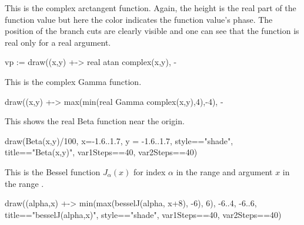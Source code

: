 {{{{{{{{{{{\begin{psXtc}
\begin{xtccomment}
This is the complex arctangent function.
Again, the height is the real part of the function value but here
the color indicates the function value's phase.
The position of the branch cuts are clearly visible and one can
see that the function is real only for a real argument.
\end{xtccomment}
\begin{spadsrc}
vp := draw((x,y) +-> real atan complex(x,y), -%
\end{spadsrc}
\end{psXtc}

\begin{psXtc}
\begin{xtccomment}
This is the complex Gamma function.
\end{xtccomment}
\begin{spadsrc}
draw((x,y) +-> max(min(real Gamma complex(x,y),4),-4), -%
\end{spadsrc}
\end{psXtc}

\begin{psXtc}
\begin{xtccomment}
This shows the real Beta function near the origin.
\end{xtccomment}
\begin{spadsrc}
draw(Beta(x,y)/100, x=-1.6..1.7, y = -1.6..1.7, style=="shade", title=="Beta(x,y)", var1Steps==40, var2Steps==40)
\end{spadsrc}
\end{psXtc}

\begin{psXtc}
\begin{xtccomment}
This is the Bessel function $J_\alpha (x)$
for index $\alpha$ in the range  and
argument $x$ in the range .
\end{xtccomment}
\begin{spadsrc}
draw((alpha,x) +-> min(max(besselJ(alpha, x+8), -6), 6), -6..4, -6..6, title=="besselJ(alpha,x)", style=="shade", var1Steps==40, var2Steps==40)
\end{spadsrc}
\end{psXtc}

}}}}}}}}}}}
